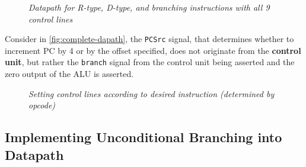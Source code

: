 \documentclass[11pt]{article}
\begin{document}
\begin{figure}[htbp]
    \centering
    \caption{\textit{Datapath for R-type, D-type, and branching instructions with all 9 control lines}}
    \label{fig:complete-dapath}
\end{figure}

Consider in \autoref{fig:complete-dapath}, the \texttt{PCSrc} signal, that determines whether to increment PC by 4 or by the offset specified, does not originate from the \textbf{control unit}, but rather the \texttt{branch} signal from the control unit being asserted and the zero output of the ALU is asserted.

\begin{figure}[htbp]
    \centering
    \caption{\textit{Setting control lines according to desired instruction (determined by opcode)}}
\end{figure}

\subsection*{Implementing Unconditional Branching into Datapath}
\end{document}
